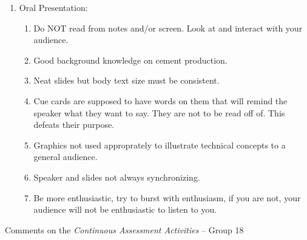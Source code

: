 \documentclass[14pt,twoside]{report}
\begin{document}
\begin{enumerate}
\item Oral Presentation:
\begin{enumerate}
%
\item Do NOT read from notes and/or screen. Look at and interact with your audience.
%
\item Good background knowledge on cement production.
%
\item Neat slides but body text size must be consistent.
%
\item Cue cards are supposed to have words on them that will remind the speaker what they want to say. They are not to be read off of. This defeats their purpose.
%
\item Graphics not used approprately to illustrate technical concepts to a general audience.
%
\item Speaker and slides not always synchronizing.
%
\item Be more enthusiastic, try to burst with enthusiasm, if you are not, your audience will not be enthusiastic to listen to you.
%
\end{enumerate}

\end{enumerate}


\clearpage



\bigskip

\begin{center}
  {\Large Comments on the {\it Continuous Assessment Activities} -- Group 18}
\end{center}
\end{document}
